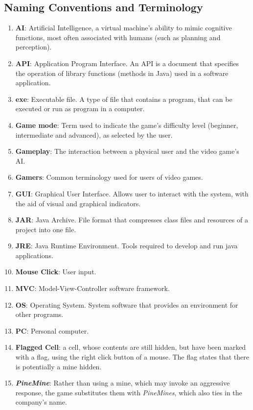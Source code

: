 \documentclass[12pt, titlepage]{article}
\begin{document}
\subsection{Naming Conventions and Terminology}
\begin{enumerate}
	\item \textbf{AI}: Artificial Intelligence, a virtual machine's ability to mimic cognitive functions, most often 
	associated with humans (such as planning and perception).
	\item \textbf{API}: Application Program Interface. An API is a document that specifies the operation of library functions
	(methods in Java) used in a software application.
	\item \textbf{exe}: Executable file. A type of file that contains a program, that can be executed or run as 
	program in a computer.
	\item \textbf{Game mode}: Term used to indicate the game's difficulty level (beginner, intermediate and 						 advanced), as selected by the user.
	\item \textbf{Gameplay}: The interaction between a physical user and the video game's AI.
	\item \textbf{Gamers}: Common terminology used for users of video games.
	\item \textbf{GUI}: Graphical User Interface. Allows user to interact with the system, with the aid of visual 
	and graphical indicators.
	\item \textbf{JAR}: Java Archive. File format that compresses class files and resources of a project into one file.
	\item \textbf{JRE}: Java Runtime Environment. Tools required to develop and run java applications.
	\item \textbf{Mouse Click}: User input.
	\item \textbf{MVC}: Model-View-Controller software framework.
	\item \textbf{OS}: Operating System. System software that provides an environment for other programs.
	\item \textbf{PC}: Personal computer.
	\item \textbf{Flagged Cell}: a cell, whose contents are still hidden, but have been marked with a flag, 						 using the right click button of a mouse. The flag states that there is potentially a mine hidden.
	\item \textbf{\textit{PineMine}}: Rather than using a mine, which may invoke an aggressive response, the game 
	substitutes them with \textit{PineMines}, which also ties in the company's name.
\end{enumerate}
\end{document}
